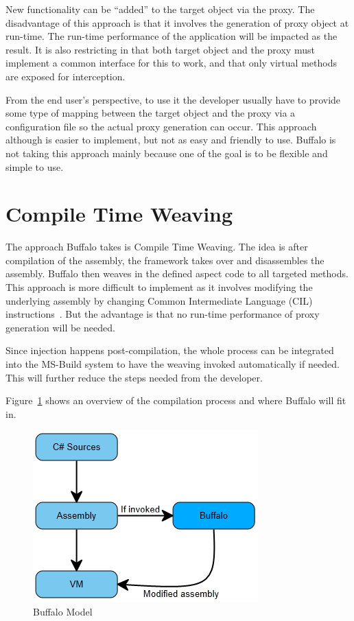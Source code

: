 New functionality can be “added” to the target object via the proxy. The disadvantage of this approach is that it involves the generation of proxy object at run-time. The run-time performance of the application will be impacted as the result. It is also restricting in that both target object and the proxy must implement a common interface for this to work, and that only virtual methods are exposed for interception.

From the end user's perspective, to use it the developer usually have to provide some type of mapping between the target object and the proxy via a configuration file so the actual proxy generation can occur. This approach although is easier to implement, but not as easy and friendly to use. Buffalo is not taking this approach mainly because one of the goal is to be flexible and simple to use.

\section{Compile Time Weaving}

The approach Buffalo takes is Compile Time Weaving. The idea is after compilation of the assembly, the framework takes over and disassembles the assembly. Buffalo then weaves in the defined aspect code to all targeted methods. This approach is more difficult to implement as it involves modifying the underlying assembly by changing Common Intermediate Language (CIL) instructions~\cite{rewrite_msil}. But the advantage is that no run-time performance of proxy generation will be needed. 

Since injection happens post-compilation, the whole process can be integrated into the MS-Build system to have the weaving invoked automatically if needed. This will further reduce the steps needed from the developer.

Figure~\ref{buffalo_model} shows an overview of the compilation process and where Buffalo will fit in.

\begin{figure}[H]
  \includegraphics[scale=1.0]{BuffaloOverview.PNG}
  \centering
  \caption{Buffalo Model\label{buffalo_model}}
\end{figure}

